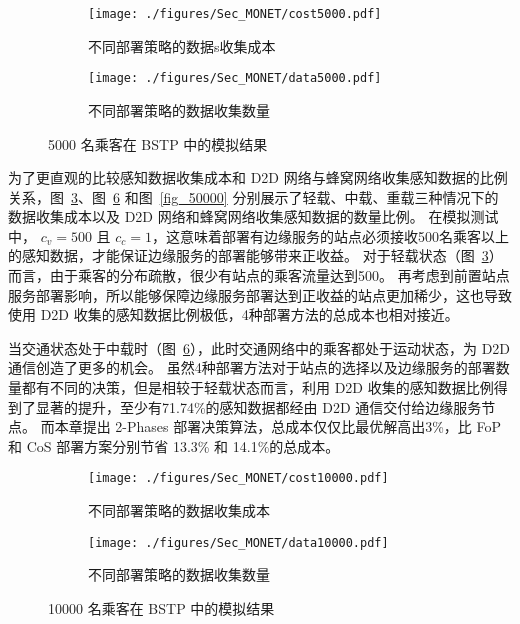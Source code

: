 \begin{figure}[!b]
  \centering
  \begin{subfigure}[b]{0.45\linewidth}
    \texttt{[image: ./figures/Sec\_MONET/cost5000.pdf]}
    \label{fig_cost5000}
    \vspace{-2em}
    \caption{不同部署策略的数据s收集成本}
  \end{subfigure}
  \begin{subfigure}[b]{0.45\linewidth}
    \texttt{[image: ./figures/Sec\_MONET/data5000.pdf]}
    \label{fig_data5000}
    \vspace{-2em}
    \caption{不同部署策略的数据收集数量}
  \end{subfigure}
    \vspace{-0.5em}
    \caption{5000 名乘客在 BSTP 中的模拟结果}
  \label{fig_5000}
\end{figure}

为了更直观的比较感知数据收集成本和 D2D 网络与蜂窝网络收集感知数据的比例关系，图~\ref{fig_5000}、图~\ref{fig_10000} 和图~\ref{fig_50000} 分别展示了轻载、中载、重载三种情况下的数据收集成本以及 D2D 网络和蜂窝网络收集感知数据的数量比例。
在模拟测试中， $c_v = 500$ 且 $c_c = 1$，这意味着部署有边缘服务的站点必须接收500名乘客以上的感知数据，才能保证边缘服务的部署能够带来正收益。
对于轻载状态（图~\ref{fig_5000}）而言，由于乘客的分布疏散，很少有站点的乘客流量达到500。
再考虑到前置站点服务部署影响，所以能够保障边缘服务部署达到正收益的站点更加稀少，这也导致使用 D2D 收集的感知数据比例极低，4种部署方法的总成本也相对接近。


当交通状态处于中载时（图~\ref{fig_10000}），此时交通网络中的乘客都处于运动状态，为 D2D 通信创造了更多的机会。
虽然4种部署方法对于站点的选择以及边缘服务的部署数量都有不同的决策，但是相较于轻载状态而言，利用 D2D 收集的感知数据比例得到了显著的提升，至少有71.74\%的感知数据都经由 D2D 通信交付给边缘服务节点。
而本章提出 2-Phases 部署决策算法，总成本仅仅比最优解高出3\%，比 FoP 和 CoS 部署方案分别节省 13.3\% 和 14.1\%的总成本。

\begin{figure}[!h]
  \centering
  \begin{subfigure}[b]{0.45\linewidth}
    \texttt{[image: ./figures/Sec\_MONET/cost10000.pdf]}
    \label{fig_cost10000}
    \vspace{-2em}
    \caption{不同部署策略的数据收集成本}
  \end{subfigure}
  \begin{subfigure}[b]{0.45\linewidth}
    \texttt{[image: ./figures/Sec\_MONET/data10000.pdf]}
    \label{fig_data10000}
    \vspace{-2em}
    \caption{不同部署策略的数据收集数量}
  \end{subfigure}
    \vspace{-0.5em}
    \caption{10000 名乘客在 BSTP 中的模拟结果}
  \label{fig_10000}
\end{figure}

